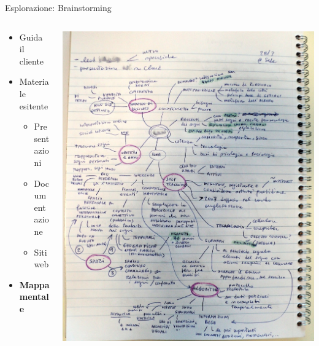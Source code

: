 \documentclass[compress, red, 14pt, pdf]{beamer}
\begin{document}
	\begin{frame}{Esplorazione: Brainstorming}
		\begin{columns}[T]
		    \begin{column}{.5\textwidth}
				\begin{itemize}
					\item Guida il cliente
					\item Materiale esitente
					\begin{itemize}
						\item Presentazioni
						\item Documentazione
						\item Siti web
					\end{itemize}
				\end{itemize}	

				\begin{itemize}
					\item \textbf{Mappa mentale}
				\end{itemize}
		    \end{column}
		    \begin{column}{.5\textwidth}
				\hspace*{-0.4cm} \includegraphics[scale=0.17]{images/mindmap-1}
		    \end{column}
		 \end{columns}
	\end{frame}
	
\end{document}
